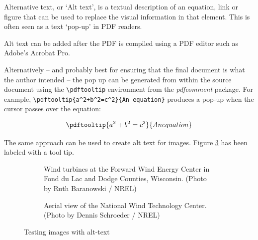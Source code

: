 Alternative text, or `Alt text', is a textual description of an equation, link or figure that can be used to replace the visual information in that element. This is often seen as a text `pop-up' in PDF readers. 

Alt text can be added after the PDF is compiled using a PDF editor such as Adobe's Acrobat Pro. 

Alternatively -- and probably best for ensuring that the final document is what the author intended -- the pop up can be generated from within the source document using the \verb+\pdftooltip+ environment from the \emph{pdfcomment} package. For example, \verb?\pdftooltip{a^2+b^2=c^2}{An equation}? produces a pop-up when the cursor passes over the equation:

\begin{equation}
\pdftooltip{a^2+b^2=c^2}{An equation}
\end{equation}

The same approach can be used to create alt text for images. Figure \ref{fig:TestImagesWithAltText} has been labeled with a tool tip. 

\begin{figure}
	\begin{subfigure}[t]{.45\linewidth}
		\centering
		{}
		\caption{Wind turbines at the Forward Wind Energy Center in Fond du Lac and Dodge Counties, Wisconsin. (Photo by Ruth Baranowski / NREL)}\label{fig:21206WithAltText}
	\end{subfigure}%
	\hfill
	\begin{subfigure}[t]{.45\linewidth}
		\centering
		{}
            \caption{Aerial view of the National Wind Technology Center. (Photo by Dennis Schroeder / NREL)}\label{fig:20018WithAltText2}
	\end{subfigure}
	\caption{Testing images with alt-text}\label{fig:TestImagesWithAltText}
\end{figure}